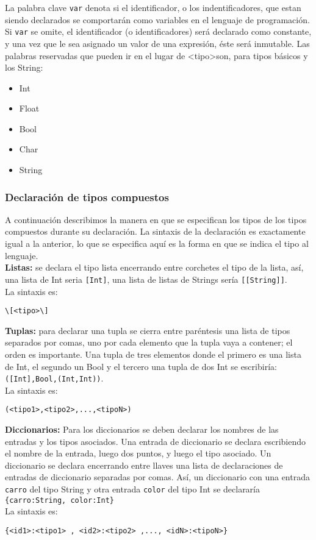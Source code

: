 \documentclass[12pt, spanish]{report}
\begin{document}
La palabra clave \texttt{var} denota si el identificador, o los
indentificadores, que estan siendo declarados se comportar\'an como
variables en el lenguaje de programaci\'on. Si \texttt{var} se omite, el
identificador (o identificadores) ser\'a declarado como constante, y una
vez que le sea asignado un valor de una expresi\'on, \'este ser\'a
inmutable. Las palabras reservadas que pueden ir en el lugar de
\textless tipo\textgreater son, para tipos b\'asicos y los String:
\begin{itemize}
\item Int
\item Float
\item Bool
\item Char
\item String
\end{itemize}

\subsubsection{Declaraci\'on de tipos compuestos}
\label{sec:declc}
A continuaci\'on describimos la manera en que se especifican los tipos
de los tipos compuestos durante su declaraci\'on. La sintaxis de la
declaraci\'on es exactamente igual a la anterior, lo que se especifica
aqu\'i es la forma en que se indica el tipo al lenguaje.\\

\textbf{Listas:} se declara el tipo lista encerrando entre corchetes el
tipo de la lista, as\'i, una lista de Int seria \texttt{[Int]}, una lista de
listas de Strings ser\'ia \texttt{[[String]]}.\\
La sintaxis es:
\begin{verbatim}
\[<tipo>\]
\end{verbatim}

\textbf{Tuplas:} para declarar una tupla se cierra entre par\'entesis
una lista de tipos separados por comas, uno por cada elemento que la
tupla vaya a contener; el orden es importante. Una tupla de tres
elementos donde el primero es una lista de Int, el segundo un Bool y el
tercero una tupla de dos Int se escribir\'ia: \texttt{([Int],Bool,(Int,Int))}.\\
La sintaxis es:
\begin{verbatim}
(<tipo1>,<tipo2>,...,<tipoN>)
\end{verbatim}


\textbf{Diccionarios:} Para los diccionarios se deben declarar los
nombres de las entradas y los tipos asociados. Una entrada de
diccionario se declara escribiendo el nombre de la entrada, luego dos
puntos, y luego el tipo asociado. Un diccionario se declara encerrando
entre llaves una lista de declaraciones de entradas de diccionario
separadas por comas. As\'i, un diccionario con una entrada
\texttt{carro} del tipo String y otra entrada \texttt{color} del tipo
Int se declarar\'ia \texttt{\{carro:String, color:Int\}}\\
La sintaxis es:
\begin{verbatim}
{<id1>:<tipo1> , <id2>:<tipo2> ,..., <idN>:<tipoN>}
\end{verbatim}
\end{document}
